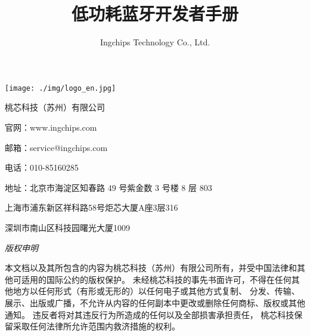 \documentclass[
  12pt,
]{book}
\title{低功耗蓝牙开发者手册}
\author{Ingchips Technology Co., Ltd.}
\date{}
\let\oldmaketitle\maketitle
\begin{document}
\maketitle

\thispagestyle{empty}
\begin{center}
\end{center}

\setlength{\abovedisplayskip}{-5pt}
\setlength{\abovedisplayshortskip}{-5pt}

\thispagestyle{empty}

\makeatletter
\begin{center}
    \vspace{5ex}
    \texttt{[image: ./img/logo\_en.jpg]}\\[15ex]
    {\huge  \@title }
    \vspace{48ex}
\end{center}

桃芯科技（苏州）有限公司

官网：www.ingchips.com

邮箱：service@ingchips.com

电话：010-85160285

地址：北京市海淀区知春路 49 号紫金数 3 号楼 8 层 803

\hspace{2.8em}上海市浦东新区祥科路58号炬芯大厦A座3层316

\hspace{2.8em}深圳市南山区科技园曙光大厦1009

\makeatother

\newpage
\thispagestyle{empty}

\makeatletter

\vspace*{40em}

\emph{版权申明}

本文档以及其所包含的内容为桃芯科技（苏州）有限公司所有，并受中国法律和其他可适用的国际公约的版权保护。
未经桃芯科技的事先书面许可，不得在任何其他地方以任何形式（有形或无形的）以任何电子或其他方式复制、
分发、传输、展示、出版或广播，不允许从内容的任何副本中更改或删除任何商标、版权或其他通知。
违反者将对其违反行为所造成的任何以及全部损害承担责任， 桃芯科技保留采取任何法律所允许范围内救济措施的权利。

\end{document}
